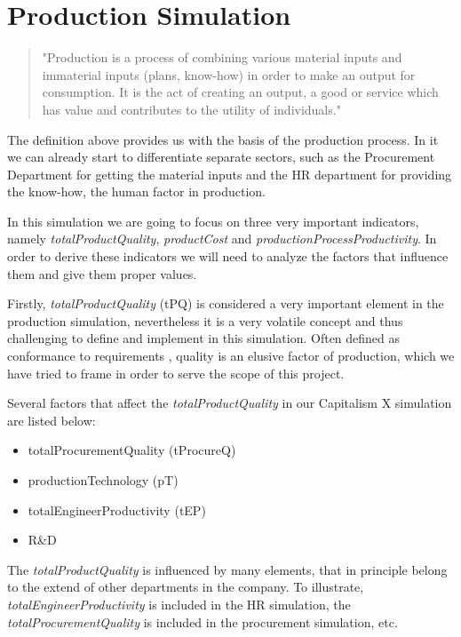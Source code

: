 \section{Production Simulation}
\label{sec:productionSim}
 \begin{quotation}
"Production is a process of combining various material inputs and immaterial inputs (plans, know-how) in order to make an output for consumption. It is the act of creating an output, a good or service which has value and contributes to the utility of individuals."\cite{noauthor_production_2019}
 \end{quotation}
The definition above provides us with the basis of the production process. In it we can already start to differentiate separate sectors, such as the Procurement Department for getting the material inputs and the HR department for providing the know-how, the human factor in production. 

In this simulation we are going to focus on three very important indicators, namely \textit{totalProductQuality}, \textit{productCost} and \textit{productionProcessProductivity}. In order to derive these indicators we will need to analyze the factors that influence them and give them proper values. 

Firstly, \textit{totalProductQuality} (\gls{tPQ}) is considered a very important element in the production simulation, nevertheless it is a very volatile concept and thus challenging to define and implement in this simulation. Often defined as conformance to requirements \cite{crosby_quality_1979}, quality is an elusive factor of production, which we have tried to frame in order to serve the scope of this project.

 Several factors that affect the \textit{totalProductQuality} in our Capitalism X simulation are listed below:
\begin{itemize}
\item totalProcurementQuality (tProcureQ)
\item productionTechnology (\gls{pT})
\item totalEngineerProductivity (\gls{tEP}) 

\item R\&D
\end{itemize}
The \textit{totalProductQuality} is influenced by many elements, that in principle belong to the extend of other departments in the company. To illustrate, \textit{totalEngineerProductivity} is included in the HR simulation, the \textit{totalProcurementQuality} is included in the procurement simulation, etc. 

